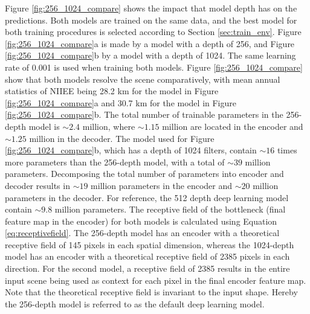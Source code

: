 \documentclass[../main/thesis]{subfiles}
\begin{document}
Figure \ref{fig:256_1024_compare} shows the impact that model depth has on the predictions. Both models are trained on the same data, and the best model for both training procedures is selected according to Section \ref{sec:train_env}. Figure \ref{fig:256_1024_compare}a is made by a model with a depth of 256, and Figure \ref{fig:256_1024_compare}b by a model with a depth of 1024. The same learning rate of 0.001 is used when training both models. Figure \ref{fig:256_1024_compare} show that both models resolve the scene comparatively, with mean annual statistics of NIIEE being 28.2 km for the model in Figure \ref{fig:256_1024_compare}a and 30.7 km for the model in Figure \ref{fig:256_1024_compare}b. The total number of trainable parameters in the 256-depth model is $\sim 2.4$ million, where $\sim 1.15$ million are located in the encoder and $\sim 1.25$ million in the decoder. The model used for Figure \ref{fig:256_1024_compare}b, which has a depth of 1024 filters, contain $\sim 16$ times more parameters than the 256-depth model, with a total of $\sim39 $ million parameters. Decomposing the total number of parameters into encoder and decoder results in $\sim 19$ million parameters in the encoder and $\sim 20$ million parameters in the decoder. For reference, the 512 depth deep learning model contain $\sim 9.8$ million parameters. The receptive field of the bottleneck (final feature map in the encoder) for both models is calculated using Equation \ref{eq:receptivefield}. The 256-depth model has an encoder with a theoretical receptive field of 145 pixels in each spatial dimension, whereas the 1024-depth model has an encoder with a theoretical receptive field of 2385 pixels in each direction. For the second model, a receptive field of 2385 results in the entire input scene being used as context for each pixel in the final encoder feature map. Note that the theoretical receptive field is invariant to the input shape. Hereby the 256-depth model is referred to as the default deep learning model.
\end{document}
